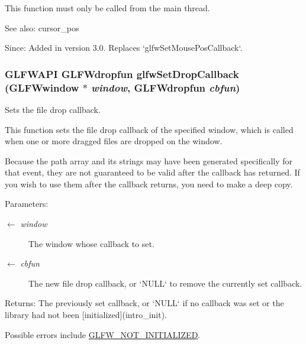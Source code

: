 This function must only be called from the main thread.

\begin{Desc}
\item[See also:]cursor\_\-pos\end{Desc}
\begin{Desc}
\item[Since:]Added in version 3.0. Replaces `glfwSetMousePosCallback`. \end{Desc}
\hypertarget{group__input_gd4fc40df63a5d0441ab06de9a585cc04}{
\subsubsection[glfwSetDropCallback]{\setlength{\rightskip}{0pt plus 5cm}GLFWAPI {\bf GLFWdropfun} glfwSetDropCallback ({\bf GLFWwindow} $\ast$ {\em window}, \/  {\bf GLFWdropfun} {\em cbfun})}}
\label{group__input_gd4fc40df63a5d0441ab06de9a585cc04}


Sets the file drop callback. 

This function sets the file drop callback of the specified window, which is called when one or more dragged files are dropped on the window.

Because the path array and its strings may have been generated specifically for that event, they are not guaranteed to be valid after the callback has returned. If you wish to use them after the callback returns, you need to make a deep copy.

\begin{Desc}
\item[Parameters:]
\begin{description}
\item[\mbox{$\leftarrow$} {\em window}]The window whose callback to set. \item[\mbox{$\leftarrow$} {\em cbfun}]The new file drop callback, or `NULL` to remove the currently set callback. \end{description}
\end{Desc}
\begin{Desc}
\item[Returns:]The previously set callback, or `NULL` if no callback was set or the library had not been \mbox{[}initialized\mbox{]}(intro\_\-init).\end{Desc}
Possible errors include \hyperlink{group__errors_g2374ee02c177f12e1fa76ff3ed15e14a}{GLFW\_\-NOT\_\-INITIALIZED}.

